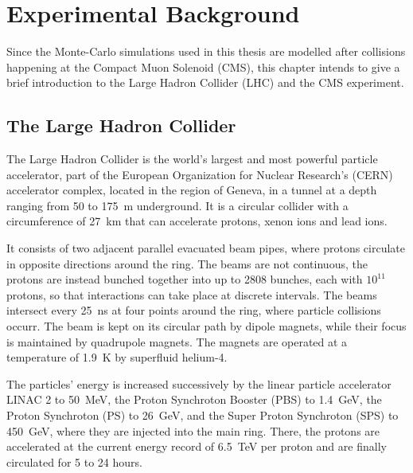\chapter{Experimental Background}
\label{ch:experiment}
Since the Monte-Carlo simulations used in this thesis are modelled after collisions happening at the Compact Muon Solenoid (CMS), this chapter intends to give a brief introduction to the Large Hadron Collider (LHC) and the CMS experiment.

\section{The Large Hadron Collider}
The Large Hadron Collider is the world's largest and most powerful particle accelerator, part of the European Organization for Nuclear Research's (CERN) accelerator complex, located in the region of Geneva, in a tunnel at a depth ranging from 50 to \SI{175}{m} underground. It is a circular collider with a circumference of \SI{27}{km} that can accelerate protons, xenon ions and lead ions.

It consists of two adjacent parallel evacuated beam pipes, where protons circulate in opposite directions around the ring. The beams are not continuous, the protons are instead bunched together into up to 2808 bunches, each with $10^{11}$ protons, so that interactions can take place at discrete intervals. The beams intersect every \SI{25}{ns} at four points around the ring, where particle collisions occurr. The beam is kept on its circular path by dipole magnets, while their focus is maintained by quadrupole magnets. The magnets are operated at a temperature of \SI{1.9}{K} by superfluid helium-4.

The particles' energy is increased successively by the linear particle accelerator LINAC 2 to \SI{50}{MeV}, the Proton Synchroton Booster (PBS) to \SI{1.4}{GeV}, the Proton Synchroton (PS) to \SI{26}{GeV}, and the Super Proton Synchroton (SPS) to \SI{450}{GeV}, where they are injected into the main ring. There, the protons are accelerated at the current energy record of \SI{6.5}{TeV} per proton and are finally circulated for 5 to 24 hours.

